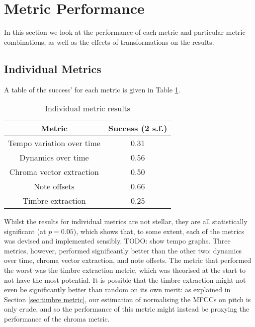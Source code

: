 \documentclass[oneside, class=book, 12pt, crop=false]{standalone}
\begin{document}
\section{Metric Performance}

In this section we look at the performance of each metric and particular metric combinations, as well as the effects of transformations on the results.

\subsection{Individual Metrics}

A table of the success' for each metric is given in Table \ref{table:metric results}. 

\begin{table}[h]
    \centering
    \begin{tabular}{cc}
        \textbf{Metric}&\textbf{Success} (2 s.f.) \\
        \midrule[0.15em]
        Tempo variation over time&0.31 \\
        Dynamics over time&0.56 \\
         Chroma vector extraction&0.50 \\
         Note offsets&0.66 \\
         Timbre extraction&0.25\\
    \end{tabular}
    \caption{Individual metric results}
    \label{table:metric results}
\end{table}

Whilst the results for individual metrics are not stellar, they are all statistically significant (at $p=0.05$), which shows that, to some extent, each of the metrics was devised and implemented sensibly. TODO: show tempo graphs. Three metrics, however, performed significantly better than the other two: dynamics over time, chroma vector extraction, and note offsets. The metric that performed the worst was the timbre extraction metric, which was theorised at the start to not have the most potential. It is possible that the timbre extraction might not even be significantly better than random on its own merit: as explained in Section \ref{sec:timbre metric}, our estimation of normalising the MFCCs on pitch is only crude, and so the performance of this metric might instead be proxying the performance of the chroma metric.

\end{document}
